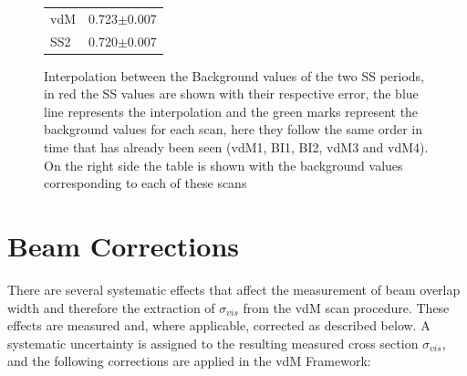 \begin{figure}[!h]
\begin{minipage}{6cm}
\begin{center}
\begin{tabular}{lc}
vdM           & 0.723$\pm$0.007              \\
SS2           & 0.720$\pm$0.007      
\end{tabular}
   \end{center}
  \end{minipage}
   \caption[Background interpolation]{Interpolation between the Background values ​​of the two SS periods, in red the SS values ​​are shown with their respective error, the blue line represents the interpolation and the green marks represent  the background values ​for each scan, here they follow the same order in time that has already been seen (vdM1, BI1, BI2, vdM3 and vdM4). On the right side the table is shown with the background values ​​corresponding to each of these scans}
  \label{interpolation}
\end{figure}

\section{Beam Corrections}
\label{bbcorrections}
There are several systematic effects that affect the measurement of beam overlap width and therefore the extraction of $\sigma_{vis}$ from the vdM scan procedure. These effects are measured and, where applicable, corrected as described below. A systematic uncertainty is assigned to the resulting measured cross section $\sigma_{vis}$, and the following corrections are applied in the vdM Framework:
 
